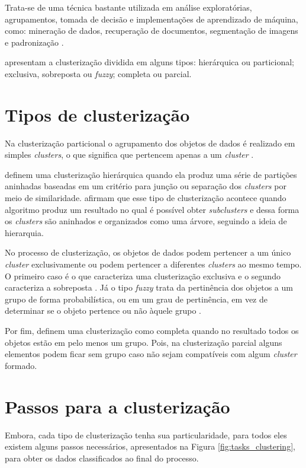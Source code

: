 Trata-se de uma técnica bastante utilizada em análise exploratórias, agrupamentos, 
tomada de decisão e implementações de aprendizado de máquina, como:
mineração de dados, recuperação de documentos, segmentação de imagens e padronização \cite{clustering_review}.

 apresentam a clusterização dividida em alguns tipos: 
hierárquica ou particional; exclusiva, sobreposta ou \textit{fuzzy}; completa ou parcial.

\section{Tipos de clusterização}
Na clusterização particional o agrupamento dos 
objetos de dados é realizado em simples \textit{clusters}, o que significa que pertencem apenas a um \textit{cluster} \cite{tan2013data}.

 definem uma clusterização hierárquica quando ela produz uma série
de partições aninhadas baseadas em um critério para junção ou separação dos \textit{clusters} por meio de similaridade. 
 afirmam que esse tipo de clusterização acontece quando algoritmo
produz um resultado no qual é possível obter \textit{subclusters} e dessa forma os \textit{clusters} são aninhados
e organizados como uma árvore, seguindo a ideia de hierarquia.

No processo de clusterização, os objetos de dados podem pertencer a um único \textit{cluster} exclusivamente ou podem
pertencer a diferentes \textit{clusters} ao mesmo tempo. O primeiro caso é o que caracteriza uma clusterização exclusiva e o segundo caracteriza a sobreposta \cite{tan2013data}. 
Já o tipo \textit{fuzzy} trata da pertinência dos objetos a um grupo de forma probabilística, 
ou em um grau de pertinência, em vez de determinar se o objeto pertence ou não àquele grupo \cite{tan2013data, clustering_review}.

Por fim,  definem uma clusterização como completa quando no resultado todos os objetos estão em pelo menos um grupo. 
Pois, na clusterização parcial alguns elementos podem ficar sem grupo caso não sejam compatíveis com algum \textit{cluster} formado.

\section{Passos para a clusterização}

Embora, cada tipo de clusterização tenha sua particularidade, para todos eles existem alguns passos necessários, apresentados na Figura \ref{fig:tasks_clustering}, 
para obter os dados classificados ao final do processo.

